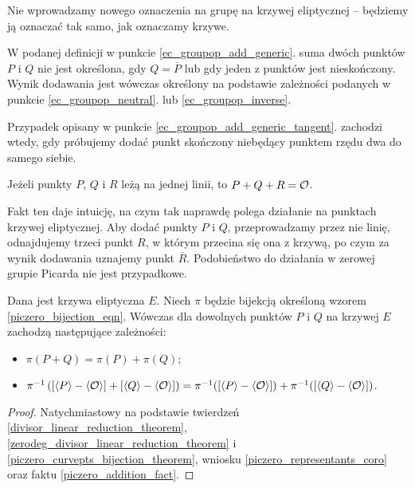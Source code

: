 \begin{remark}
Nie wprowadzamy nowego oznaczenia na grupę na krzywej eliptycznej --
będziemy ją oznaczać tak samo, jak oznaczamy krzywe.
\end{remark}

\begin{remark}
W podanej definicji w punkcie \ref{ec_groupop_add_generic}.
suma dwóch punktów $P$ i $Q$
nie jest określona, gdy $Q = \overline{P}$
lub gdy jeden z punktów jest nieskończony.
Wynik dodawania jest wówczas określony
na podstawie zależności podanych w punkcie
\ref{ec_groupop_neutral}. lub \ref{ec_groupop_inverse}.
\end{remark}

\begin{remark}
Przypadek opisany w punkcie \ref{ec_groupop_add_generic_tangent}.
zachodzi wtedy,
gdy próbujemy dodać punkt skończony niebędący punktem rzędu dwa
do samego siebie.
\end{remark}

\begin{fact}
Jeżeli punkty $P$, $Q$ i $R$ leżą na jednej linii,
to $P + Q + R = \mathcal{O}$.
\end{fact}

Fakt ten daje intuicję, na czym tak naprawdę polega działanie
na punktach krzywej eliptycznej.
Aby dodać punkty $P$ i $Q$, przeprowadzamy przez nie linię,
odnajdujemy trzeci punkt $R$,
w którym przecina się ona z krzywą,
po czym za wynik dodawania uznajemy punkt $\overline{R}$.
Podobieństwo do działania w zerowej grupie Picarda nie jest przypadkowe.

\begin{theorem}
Dana jest krzywa eliptyczna $E$.
Niech $\pi$
będzie bijekcją określoną wzorem
\ref{piczero_bijection_eqn}.
Wówczas dla dowolnych punktów $P$ i $Q$ na krzywej $E$
zachodzą następujące zależności:
\begin{itemize}
\item $\pi(P + Q) = \pi(P) + \pi(Q)$;
\item
$\pi^{-1}\left(
[\left\langle P\right\rangle - \left\langle\mathcal{O}\right\rangle]
+
[\left\langle Q\right\rangle - \left\langle\mathcal{O}\right\rangle]\right
)
=
\pi^{-1}([\left\langle P\right\rangle - \left\langle\mathcal{O}\right\rangle])
+
\pi^{-1}([\left\langle Q\right\rangle - \left\langle\mathcal{O}\right\rangle])$.
\end{itemize}
\end{theorem}

\begin{proof}
Natychmiastowy na podstawie
twierdzeń
\ref{divisor_linear_reduction_theorem},
\ref{zerodeg_divisor_linear_reduction_theorem}
i \ref{piczero_curvepts_bijection_theorem},
wniosku \ref{piczero_representants_coro}
oraz faktu \ref{piczero_addition_fact}.
\end{proof}

